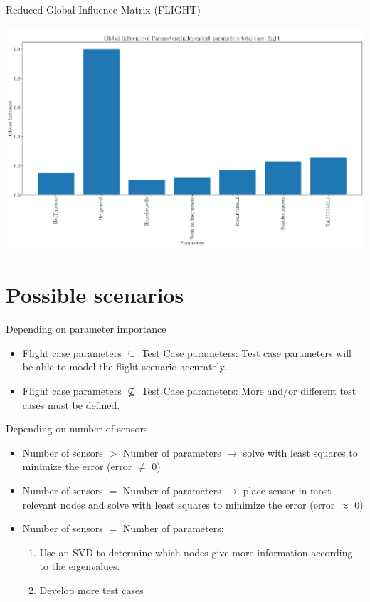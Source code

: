 \documentclass{cubeamer}
\begin{document}
\begin{frame}{Reduced Global Influence Matrix (FLIGHT)}
\begin{center}
    \includegraphics[width=0.7\linewidth]{Figures/Flight/indep-iinfglobalboth.png}
\end{center}
\end{frame}

\section{Possible scenarios}
\begin{frame}{Depending on parameter importance}
    \begin{itemize}
        \item Flight case parameters $\subseteq$ Test Case parameters: Test case parameters will be able to model the flight scenario accurately.
        \\
        \item  Flight case parameters $\not \subseteq$ Test Case parameters: More and/or different test cases must be defined.
    \end{itemize}
\end{frame}
\begin{frame}{Depending on number of sensors}
    \begin{itemize}
        \item Number of sensors $>$ Number of parameters $\longrightarrow$ solve with least squares to minimize the error (error $\neq$ 0)
        \item Number of sensors $=$ Number of parameters $\longrightarrow$ place sensor in most relevant nodes and solve with least squares to minimize the error (error $\approx$ 0)
        \item Number of sensors $=$ Number of parameters:
        \begin{enumerate}
            \item Use an SVD to determine which nodes give more information according to the eigenvalues.
            \item Develop more test cases
        \end{enumerate}
    \end{itemize}
\end{frame}
\end{document}
